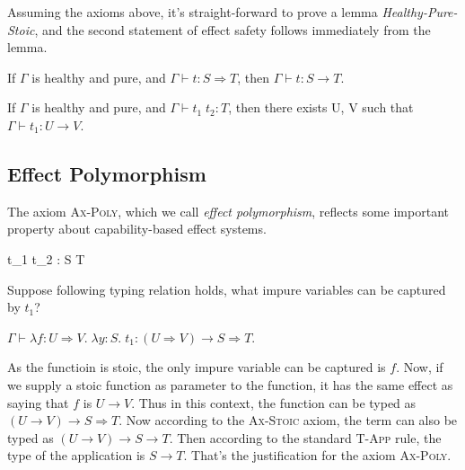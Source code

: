Assuming the axioms above, it's straight-forward to prove a lemma
\emph{Healthy-Pure-Stoic}, and the second statement of effect safety
follows immediately from the lemma.

\begin{lemma}
  If $\Gamma$ is healthy and pure,  and $\Gamma \vdash t : S
  \Rightarrow T$, then $\Gamma \vdash t : S \to T$.
\end{lemma}

\begin{theorem}
  If $\Gamma$ is healthy and pure, and $\Gamma \vdash t_1 \; t_2 :
  T$, then there exists U, V such that $\Gamma \vdash t_1 : U \to V$.
\end{theorem}


\subsection{Effect Polymorphism}

The axiom \textsc{Ax-Poly}, which we call \emph{effect polymorphism},
reflects some important property about capability-based effect
systems.

 { \Gamma \vdash t_1 \;
  t_2 : S \to T }


Suppose following typing relation holds, what impure
variables can be captured by $t_1$?

\begin{center}
  $\Gamma \vdash \lambda f:U \Rightarrow V. \; \lambda y:S. \; t_1 : (U
  \Rightarrow V) \to S \Rightarrow T$.
\end{center}

As the functioin is stoic, the only impure variable can be captured is
$f$. Now, if we supply a stoic function as parameter to the function,
it has the same effect as saying that $f$ is $U \to V$. Thus in this
context, the function can be typed as $(U \to V) \to S \Rightarrow T$.
Now according to the \textsc{Ax-Stoic} axiom, the term can also be
typed as $(U \to V) \to S \to T$. Then according to the standard
\textsc{T-App} rule, the type of the application is $S \to T$. That's
the justification for the axiom \textsc{Ax-Poly}.

